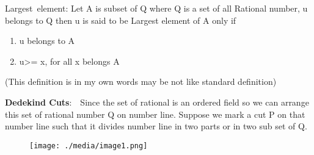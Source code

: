 \documentclass[12pt]{article}
\renewcommand{\_}{\kern-1.5pt\textunderscore\kern-1.5pt}
\begin{document}
\vspace{\baselineskip}
{\fontsize{14pt}{16.8pt}\selectfont Largest\ element:  Let A is subset of Q where Q is a set of all Rational number, u belongs to Q then u is said to be Largest element of A only if\par}\par

\begin{enumerate}
	\item {\fontsize{14pt}{16.8pt}\selectfont u belongs to A\par}\par

	\item {\fontsize{14pt}{16.8pt}\selectfont u>= x, for all x belongs A\par}
\end{enumerate}\par


\vspace{\baselineskip}

\vspace{\baselineskip}
\begin{FlushLeft}
{\fontsize{14pt}{16.8pt}\selectfont (This definition is in my own words may be not like standard definition)\par}
\end{FlushLeft}\par


\vspace{\baselineskip}
\begin{FlushLeft}
{\fontsize{14pt}{16.8pt}\selectfont \textbf{Dedekind Cuts}:\ \ Since the set of rational is an ordered field so  we can arrange this set of rational number Q on number line. Suppose we mark a cut P on that number line such that it divides number line in two parts or in two sub set of Q.\par}
\end{FlushLeft}\par


\vspace{\baselineskip}

\vspace{\baselineskip}



\begin{figure}[H]
	\begin{FlushLeft}		\texttt{[image: ./media/image1.png]}
	\end{FlushLeft}\end{figure}
\end{document}
